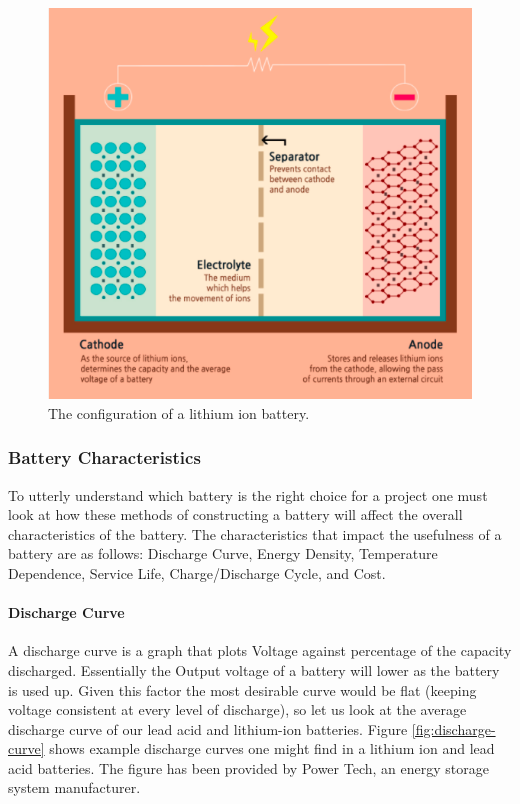 \begin{figure}
    \centering
    \includegraphics[scale=0.4]{figures/lithium ion battery.png}
    \caption{The configuration of a lithium ion battery.}
    \label{lithium-ion-battery} 
\end{figure}

\subsubsection{Battery Characteristics}
To utterly understand which battery is the right choice for a project one must look at how these methods of constructing a battery will affect the overall characteristics of the battery. The characteristics that impact the usefulness of a battery are as follows: Discharge Curve, Energy Density, Temperature Dependence, Service Life, Charge/Discharge Cycle, and Cost.

\paragraph{Discharge Curve}
A discharge curve is a graph that plots Voltage against percentage of the capacity discharged. Essentially the Output voltage of a battery will lower as the battery is used up. Given this factor the most desirable curve would be flat (keeping voltage consistent at every level of discharge), so let us look at the average discharge curve of our lead acid and lithium-ion batteries. Figure \ref{fig:discharge-curve} shows example discharge curves one might find in a lithium ion and lead acid batteries. The figure has been provided by Power Tech, an energy storage system manufacturer.

